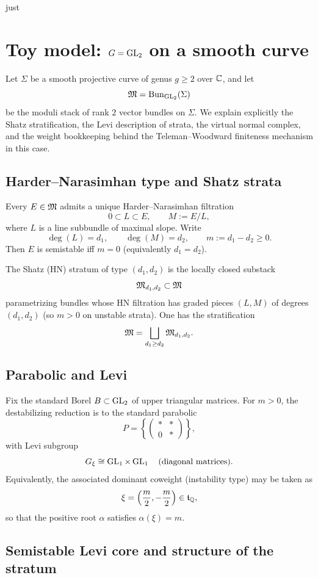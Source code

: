 just \documentclass[12pt]{article}
\begin{document}
\section{Toy model: $G=\operatorname{GL}_2$ on a smooth curve}

Let $\Sigma$ be a smooth projective curve of genus $g\ge 2$ over $\mathbb{C}$, and let
\[
\mathfrak{M}=\operatorname{Bun}_{\operatorname{GL}_2}(\Sigma)
\]
be the moduli stack of rank $2$ vector bundles on $\Sigma$.
We explain explicitly the Shatz stratification, the Levi description of strata,
the virtual normal complex, and the weight bookkeeping behind the
Teleman--Woodward finiteness mechanism in this case.

\subsection{Harder--Narasimhan type and Shatz strata}

Every $E\in \mathfrak{M}$ admits a unique Harder--Narasimhan filtration
\[
0\subset L \subset E,
\qquad M:=E/L,
\]
where $L$ is a line subbundle of maximal slope.  Write
\[
\deg(L)=d_1,\qquad \deg(M)=d_2,\qquad m:=d_1-d_2\ge 0.
\]
Then $E$ is semistable iff $m=0$ (equivalently $d_1=d_2$).

The Shatz (HN) stratum of type $(d_1,d_2)$ is the locally closed substack
\[
\mathfrak{M}_{d_1,d_2}\subset \mathfrak{M}
\]
parametrizing bundles whose HN filtration has graded pieces $(L,M)$ of degrees
$(d_1,d_2)$ (so $m>0$ on unstable strata).  One has the stratification
\[
\mathfrak{M}=\bigsqcup_{d_1\ge d_2}\mathfrak{M}_{d_1,d_2}.
\]

\subsection{Parabolic and Levi}

Fix the standard Borel $B\subset \operatorname{GL}_2$ of upper triangular matrices.
For $m>0$, the destabilizing reduction is to the standard parabolic
\[
P=\left\{\begin{pmatrix} * & * \\ 0 & * \end{pmatrix}\right\},
\]
with Levi subgroup
\[
G_\xi \cong \operatorname{GL}_1\times \operatorname{GL}_1
\quad\text{(diagonal matrices).}
\]
Equivalently, the associated dominant coweight (instability type) may be taken as
\[
\xi=\left(\frac m2,-\frac m2\right)\in \mathfrak{t}_{\mathbb{Q}},
\]
so that the positive root $\alpha$ satisfies $\alpha(\xi)=m$.

\subsection{Semistable Levi core and structure of the stratum}
\end{document}
